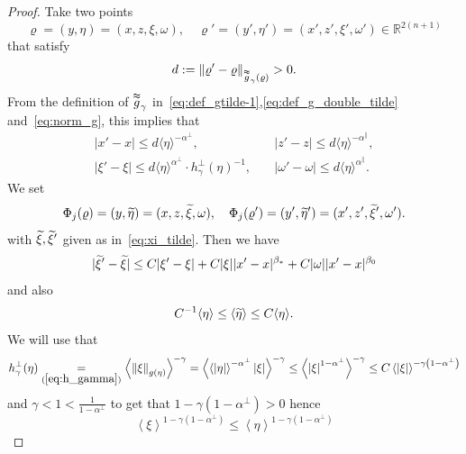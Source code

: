 \documentclass[10pt]{amsart}
\theoremstyle{definition}\newtheorem{defi}[theo]{Definition}\newtheorem{rema}[theo]{Remark}\newtheorem{exam}[theo]{Example}\newtheorem{exem}[theo]{Example}\newtheorem{nota}[theo]{Notation}
\newcommand*\eq[1]{\underset{(#1)}{=}}
\newcommand{\bbR}{\mathbb{R}}
\let\oldtilde\tilde
\renewcommand*{\tilde}[1]{\mathchoice{\widetilde{#1}}{\widetilde{#1}}{\oldtilde{#1}}{\oldtilde{#1}}}
\begin{document}
\begin{proof}
Take two points
\[
\varrho=(y,\eta)=(x,z,\xi,\omega),\quad\varrho'=(y',\eta')=(x',z',\xi',\omega')\in\bbR^{2\left(n+1\right)}
\]
that satisfy
\[
d:=\|\varrho'-\varrho\|_{\overset{\thickapprox}{g}_{\gamma}\left(\varrho\right)}>0.
\]
From the definition of $\overset{\thickapprox}{g}_{\gamma}$ in~\eqref{eq:def_gtilde-1},\eqref{eq:def_g_double_tilde} and~\eqref{eq:norm_g}, this implies that
\begin{align*}
|x'-x|\le d\langle\eta\rangle^{-\alpha^{\perp}}, &\quad|z'-z|\le d\langle\eta\rangle^{-\alpha^{\parallel}},\\
|\xi'-\xi|\le d\langle\eta\rangle^{\alpha^{\perp}}\cdot h_{\gamma}^{\perp}(\eta)^{-1},&\quad|\omega'-\omega|\le d\langle\eta\rangle^{\alpha^{\parallel}}.
\end{align*}
We set
\[
\Phi_{j}(\varrho)=(y,\tilde{\eta})=(x,z,\tilde{\xi},\omega),\quad\Phi_{j}(\varrho')=(y',\tilde{\eta}')=(x',z',\tilde{\xi}',\omega').
\]
with $\tilde{\xi},\tilde{\xi}'$ given as in~\eqref{eq:xi_tilde}. Then we have
\[
|\tilde{\xi}'-\tilde{\xi}|\le C|\xi'-\xi|+C|\xi||x'-x|^{\beta_{*}}+C|\omega||x'-x|^{\beta_{0}}
\]
and also
\[
C^{-1}\langle\eta\rangle\le\langle\tilde{\eta}\rangle\le C\langle\eta\rangle.
\]
We will use that
\begin{equation}\label{eq:*7}
h_{\gamma}^{\perp}(\eta)\eq{\ref{eq:h_gamma}}\left\langle \left\Vert \xi\right\Vert _{g\left(\eta\right)}\right\rangle ^{-\gamma}=\left\langle \left\langle \left|\eta\right|\right\rangle ^{-\alpha^{\perp}}\left|\xi\right|\right\rangle ^{-\gamma}\leq\left\langle \left|\xi\right|^{1-\alpha^{\perp}}\right\rangle ^{-\gamma}\leq C\left\langle \left|\xi\right|\right\rangle ^{-\gamma\left(1-\alpha^{\perp}\right)}
\end{equation}
and $\gamma<1<\frac{1}{1-\alpha^{\perp}}$ to get that $1-\gamma(1-\alpha^{\perp})>0$ hence
\begin{equation}\label{eq:*8} 
\left\langle \xi\right\rangle ^{1-\gamma\left(1-\alpha^{\perp}\right)}\leq\left\langle \eta\right\rangle ^{1-\gamma\left(1-\alpha^{\perp}\right)}
\end{equation}


\end{proof}
\end{document}
